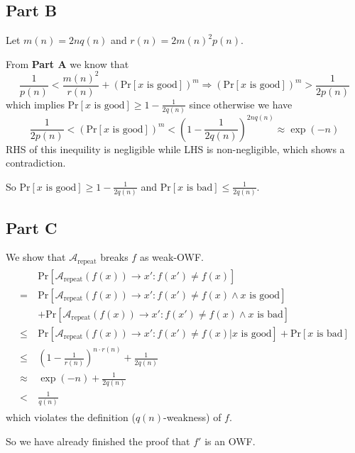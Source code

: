 \documentclass[8pt]{article}
\theoremstyle{compact}
\def\le{\leqslant}
\def\ge{\geqslant}
\begin{document}
\subsection*{Part B}
Let $m(n) = 2nq(n)$ and $r(n) = 2m(n)^2p(n)$.

From \textbf{Part A} we know that $$\frac{1}{p(n)} < \frac{m(n)^2}{r(n)} + \left(\text{Pr}[x \text{ is good}]\right)^m \Rightarrow \left(\text{Pr}[x \text{ is good}]\right)^m > \frac{1}{2p(n)}$$
which implies $\text{Pr}[x \text{ is good}] \ge 1 - \frac{1}{2q(n)}$ since otherwise we have $$\frac{1}{2p(n)} < \left(\text{Pr}[x \text{ is good}]\right)^m < \left(1 - \frac{1}{2q(n)}\right)^{2nq(n)} \approx \exp(-n)$$ RHS of this inequility is negligible while LHS is non-negligible, which shows a contradiction.

So $\text{Pr}[x \text{ is good}] \ge 1 - \frac{1}{2q(n)}$ and $\text{Pr}[x \text{ is bad}] \le \frac{1}{2q(n)}$.

\subsection*{Part C}
\def\AREP{\mathcal{A}_{\text{repeat}}}
We show that $\AREP$ breaks $f$ as weak-OWF.
\begin{align*}
	\begin{split}
		&\text{Pr}[\AREP(f(x)) \to x': f(x') \neq f(x)] \\
		= \ & \text{Pr}[\AREP(f(x)) \to x': f(x') \neq f(x) \wedge x \text{ is good}] \\ &+ \text{Pr}[\AREP(f(x)) \to x': f(x') \neq f(x) \wedge x \text{ is bad}] \\
		\le \ & \text{Pr}[\AREP(f(x)) \to x': f(x') \neq f(x) | x \text{ is good}] + \text{Pr}[x \text{ is bad}] \\
		\le \ & \left(1 - \frac{1}{r(n)}\right)^{n \cdot r(n)} + \frac{1}{2q(n)} \\
		\approx\ & \exp(-n) + \frac{1}{2q(n)} \\
		< \ & \frac{1}{q(n)}
	\end{split}
\end{align*}
which violates the definition ($q(n)$-weakness) of $f$.

So we have already finished the proof that $f'$ is an OWF.
\end{document}

